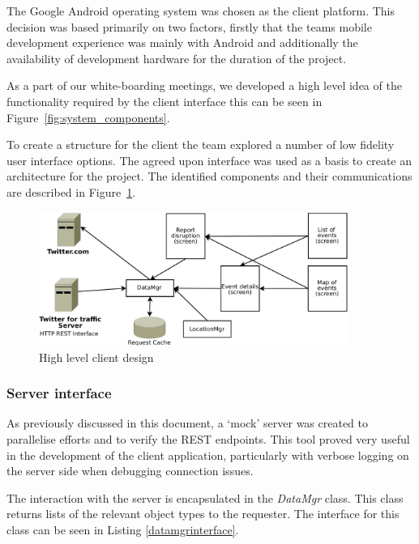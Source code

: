 The Google Android operating system was chosen as the client platform. This
decision was based primarily on two factors, firstly that the teams mobile
development experience was mainly with Android and additionally the
availability of development hardware for the duration of the project.

As a part of our white-boarding meetings, we developed a high level idea of the
functionality required by the client interface this can be seen in
Figure~\ref{fig:system_components}.

To create a structure for the client the team explored a number of low fidelity
user interface options. The agreed upon interface was used as a basis to create
an architecture for the project. The identified components and their
communications are described in Figure~\ref{fig:client_design}.

\begin{figure}[htb]
\centering
\includegraphics[width=0.9\textwidth]{images/design/client/client_high_level_layout.pdf}
\caption{High level client design}
\label{fig:client_design}
\end{figure}


\subsubsection{Server interface}
As previously discussed in this document, a `mock' server was created to
parallelise efforts and to verify the REST endpoints. This tool proved very
useful in the development of the client application, particularly with verbose
logging on the server side when debugging connection issues.

The interaction with the server is encapsulated in the \emph{DataMgr} class.
This class returns lists of the relevant object types to the requester. The
interface for this class can be seen in Listing \ref{datamgrinterface}.



